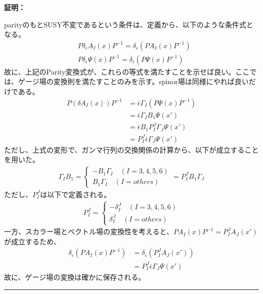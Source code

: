 \documentclass[dvipdfmx,a4paper,10.5pt]{article}
\numberwithin{equation}{section}
\newenvironment{proofbox}
{\begin{prooflabel}\textbf{証明：}\end{prooflabel}\vspace{0.8em}}
{\par\vspace{1em}\hrule\vspace{1em}}
\begin{document}
\begin{proofbox}
    parityのもとSUSY不変であるという条件は、定義から、以下のような条件式となる。
    \begin{align*}
        &P\delta_{\epsilon} A_{I}(x)P^{-1}=\delta_{\epsilon}(PA_{I}(x)P^{-1})\\
        &P\delta_{\epsilon} \Psi(x) P^{-1}=\delta_{\epsilon}(P\Psi(x) P^{-1})
    \end{align*}
    故に、上記のParity変換式が、これらの等式を満たすことを示せば良い。ここでは、ゲージ場の変換則を満たすことのみを示す。spinor場は同様にやれば良いだけである。
        \begin{align*}
            P(\delta A_{I}(x))P^{-1}&=\bar{\epsilon}\Gamma_{I}(P\Psi(x)P^{-1})\\
            &=\bar{\epsilon}\Gamma_{I}B_{1}\Psi(x')\\
            &=\bar{\epsilon}B_{1}P_{I}^{J}\Gamma_{J}\Psi(x')\\
            &=P_{I}^{J}\bar{\epsilon}\Gamma_{J}\Psi(x')
        \end{align*}
        ただし、上式の変形で、ガンマ行列の交換関係の計算から、以下が成立することを用いた。
        \begin{align*}
            \Gamma_{I}B_{1}=
            \begin{cases}
            -B_{1}\Gamma_{I} \quad(I=3,4,5,6)\\
            B_{1}\Gamma_{I}\quad (I=others)
            \end{cases}
            =P_{I}^{J}B_{1}\Gamma_{J}
        \end{align*}
        ただし、$P_{I}^{J}$は以下で定義される。
        \begin{align*}
            P_{I}^{J}=\begin{cases}
            -\delta_{I}^{J} \quad(I=3,4,5,6)\\
            \delta_{I}^{J}\quad (I=others)
            \end{cases}
        \end{align*}
        一方、スカラー場とベクトル場の変換性を考えると、$PA_{I}(x)P^{-1}=P_{I}^{J}A_{J}(x')$が成立するため、
        \begin{align*}
            \delta_{\epsilon}(PA_{I}(x)P^{-1})&=\delta_{\epsilon}(P_{I}^{J}A_{J}(x'))\\
            &=P_{I}^{J}\bar{\epsilon}\Gamma_{J}\Psi(x')
        \end{align*}
        故に、ゲージ場の変換は確かに保存される。
\end{proofbox}
\end{document}
